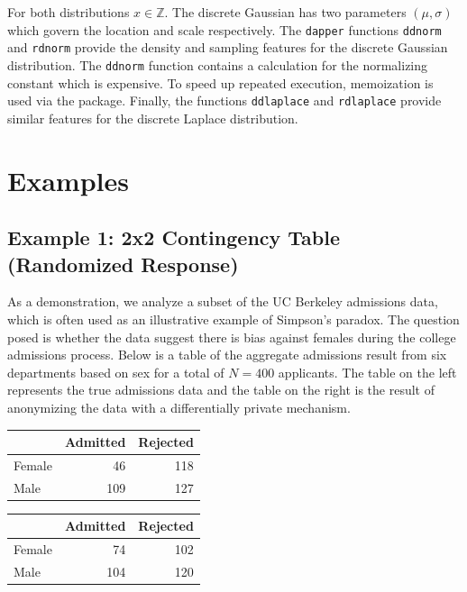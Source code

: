 For both distributions \(x \in \mathbb{Z}\). The discrete Gaussian has
two parameters \((\mu,\sigma)\) which govern the location and
scale respectively. The \texttt{dapper} functions \texttt{ddnorm} and \texttt{rdnorm} provide the
density and sampling features for the discrete Gaussian distribution. The \texttt{ddnorm}
function contains a calculation for the normalizing constant which is expensive. To
speed up repeated execution, memoization is used via the  package. Finally, the functions
\texttt{ddlaplace} and \texttt{rdlaplace} provide similar features for the discrete Laplace distribution.

\hypertarget{examples}{%
\section{Examples}\label{examples}}

\hypertarget{example-1-2x2-contingency-table-randomized-response}{%
\subsection{Example 1: 2x2 Contingency Table (Randomized Response)}\label{example-1-2x2-contingency-table-randomized-response}}

As a demonstration, we analyze a subset of the UC Berkeley admissions data, which is often
used as an illustrative example of Simpson's paradox. The question posed is whether
the data suggest there is bias against females during the college admissions
process. Below is a table of the aggregate admissions result from six departments based on sex
for a total of \(N = 400\) applicants. The table on the left represents
the true admissions data and the table on the right is the result of anonymizing
the data with a differentially private mechanism.

\begin{table}[!h]
\centering
\centering
\begin{tabular}[t]{lrr}
\toprule
  & Admitted & Rejected\\
\midrule
Female & 46 & 118\\
Male & 109 & 127\\
\bottomrule
\end{tabular}
\centering
\begin{tabular}[t]{lrr}
\toprule
  & Admitted & Rejected\\
\midrule
Female & 74 & 102\\
Male & 104 & 120\\
\bottomrule
\end{tabular}
\end{table}

